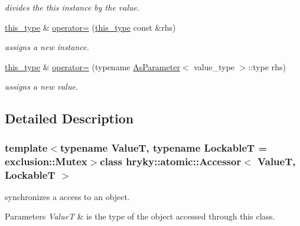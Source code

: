 \begin{DoxyCompactItemize}
\begin{DoxyCompactList}\small\item\em divides the this instance by the value. \end{DoxyCompactList}\item 
\hyperlink{classhryky_1_1atomic_1_1_accessor_a4957c9dc8163f5fb426f5eb8de5fcd12}{this\-\_\-type} \& \hyperlink{classhryky_1_1atomic_1_1_accessor_ae9dabc77d288bb8a7040059748b1e93b}{operator=} (\hyperlink{classhryky_1_1atomic_1_1_accessor_a4957c9dc8163f5fb426f5eb8de5fcd12}{this\-\_\-type} const \&rhs)
\begin{DoxyCompactList}\small\item\em assigns a new instance. \end{DoxyCompactList}\item 
\hyperlink{classhryky_1_1atomic_1_1_accessor_a4957c9dc8163f5fb426f5eb8de5fcd12}{this\-\_\-type} \& \hyperlink{classhryky_1_1atomic_1_1_accessor_a1e67e78d5ff0f5792b491ca7bfc720ce}{operator=} (typename \hyperlink{classhryky_1_1_as_parameter}{As\-Parameter}$<$ value\-\_\-type $>$\-::type rhs)
\begin{DoxyCompactList}\small\item\em assigns a new value. \end{DoxyCompactList}\end{DoxyCompactItemize}


\subsection{Detailed Description}
\subsubsection*{template$<$typename Value\-T, typename Lockable\-T = exclusion\-::\-Mutex$>$class hryky\-::atomic\-::\-Accessor$<$ Value\-T, Lockable\-T $>$}

synchronizes a access to an object. 


\begin{DoxyParams}{Parameters}
{\em Value\-T} & is the type of the object accessed through this class. \\
\hline
\end{DoxyParams}


